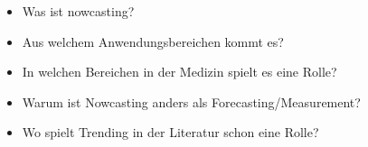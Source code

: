 \begin{itemize}
    \item Was ist nowcasting?
    \item Aus welchem Anwendungsbereichen kommt es? 
    \item In welchen Bereichen in der Medizin spielt es eine Rolle?
    \item Warum ist Nowcasting anders als Forecasting/Measurement?
    \item Wo spielt Trending in der Literatur schon eine Rolle?
\end{itemize}